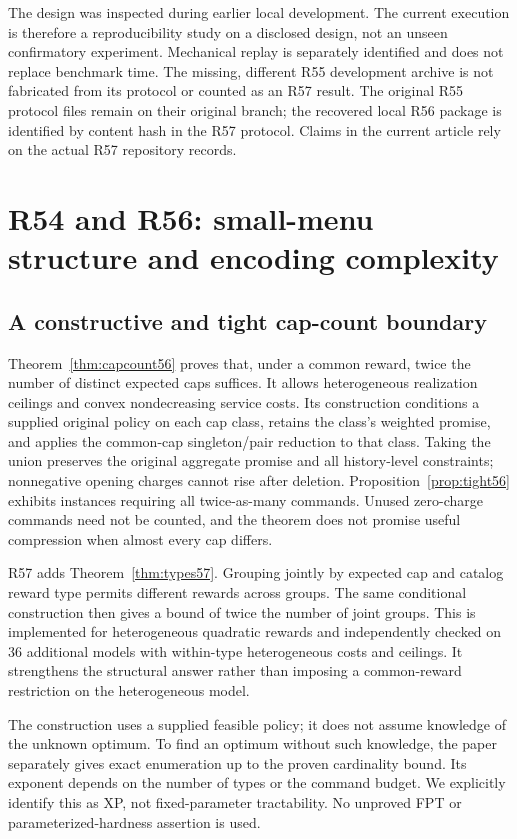 The design was inspected during earlier local development. The current execution is therefore a reproducibility study on a disclosed design, not an unseen confirmatory experiment. Mechanical replay is separately identified and does not replace benchmark time. The missing, different R55 development archive is not fabricated from its protocol or counted as an R57 result. The original R55 protocol files remain on their original branch; the recovered local R56 package is identified by content hash in the R57 protocol. Claims in the current article rely on the actual R57 repository records.

\section{R54 and R56: small-menu structure and encoding complexity}
\subsection{A constructive and tight cap-count boundary}
Theorem~\ref{thm:capcount56} proves that, under a common reward, twice the number of distinct expected caps suffices. It allows heterogeneous realization ceilings and convex nondecreasing service costs. Its construction conditions a supplied original policy on each cap class, retains the class's weighted promise, and applies the common-cap singleton/pair reduction to that class. Taking the union preserves the original aggregate promise and all history-level constraints; nonnegative opening charges cannot rise after deletion. Proposition~\ref{prop:tight56} exhibits instances requiring all twice-as-many commands. Unused zero-charge commands need not be counted, and the theorem does not promise useful compression when almost every cap differs.

R57 adds Theorem~\ref{thm:types57}. Grouping jointly by expected cap and catalog reward type permits different rewards across groups. The same conditional construction then gives a bound of twice the number of joint groups. This is implemented for heterogeneous quadratic rewards and independently checked on 36 additional models with within-type heterogeneous costs and ceilings. It strengthens the structural answer rather than imposing a common-reward restriction on the heterogeneous model.

The construction uses a supplied feasible policy; it does not assume knowledge of the unknown optimum. To find an optimum without such knowledge, the paper separately gives exact enumeration up to the proven cardinality bound. Its exponent depends on the number of types or the command budget. We explicitly identify this as XP, not fixed-parameter tractability. No unproved FPT or parameterized-hardness assertion is used.

